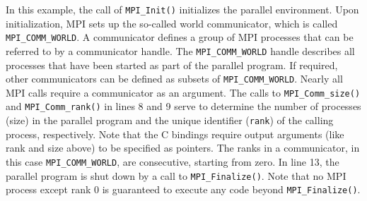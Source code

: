 In this example, the call of \verb|MPI_Init()| initializes the parallel environment. Upon initialization, MPI sets up the so-called world communicator, which is called \verb|MPI_COMM_WORLD|. A communicator defines a group of MPI processes that can be referred to by a communicator handle. The \verb|MPI_COMM_WORLD| handle describes all processes that have been started as part of the parallel program. If required, other communicators can be defined as subsets of \verb|MPI_COMM_WORLD|. Nearly all MPI calls require a communicator as an argument. The calls to \verb|MPI_Comm_size()| and \verb|MPI_Comm_rank()| in lines 8 and 9
serve to determine the number of processes (size) in the parallel program and the unique identifier (\verb|rank|) of the calling process, respectively. Note that the C bindings require output arguments (like rank and size above) to be specified as
pointers. The ranks in a communicator, in this case \verb|MPI_COMM_WORLD|, are consecutive, starting from zero. In line 13, the parallel program is shut down by a call to \verb|MPI_Finalize()|. Note that no MPI process except rank 0 is guaranteed to
execute any code beyond \verb|MPI_Finalize()|.

